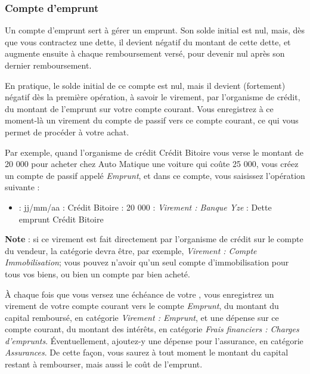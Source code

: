 \subsubsection{Compte d'emprunt\label{accounts-type-liabilities-loan}}

Un compte d'emprunt sert à gérer un emprunt. Son solde initial est nul, mais, dès que vous contractez une dette, il devient négatif du montant de cette dette, et augmente ensuite à chaque remboursement versé, pour devenir nul après son dernier remboursement. 

En pratique, le solde initial de ce compte est nul, mais il devient (fortement) négatif dès la première opération, à savoir le virement, par l'organisme de crédit, du montant de l'emprunt sur votre compte courant. Vous enregistrez à ce moment-là un virement du compte de passif vers ce compte courant, ce qui vous permet de procéder à votre achat.

Par exemple, quand l'organisme de crédit Crédit Bitoire vous verse le montant de 20 000 pour acheter chez Auto Matique une voiture qui coûte 25 000, vous créez un compte de passif appelé \emph{Emprunt}, et dans ce compte, vous saisissez l'opération suivante : 

\begin{itemize}
	\item {} : jj/mm/aa   : Crédit Bitoire   : 20 000   : \emph{Virement : Banque Yze}  : Dette emprunt Crédit Bitoire
\end{itemize}

\textbf{Note} : si ce virement est fait directement par l'organisme de crédit sur le compte du vendeur, la catégorie devra être, par exemple, \emph{Virement : Compte Immobilisation}; vous pouvez n'avoir qu'un seul compte d'immobilisation pour tous vos biens, ou bien un compte par bien acheté.

À chaque fois que vous versez une échéance de votre , vous enregistrez un virement de votre compte courant vers le compte \emph{Emprunt}, du montant du capital remboursé, en catégorie \emph{Virement : Emprunt}, et une dépense sur ce compte courant, du montant des intérêts, en catégorie \emph{Frais financiers : Charges d'emprunts}. Éventuellement, ajoutez-y une dépense pour l'assurance, en catégorie \emph{Assurances}. De cette façon, vous saurez à tout moment le montant du capital restant à rembourser, mais aussi le coût de l'emprunt.

